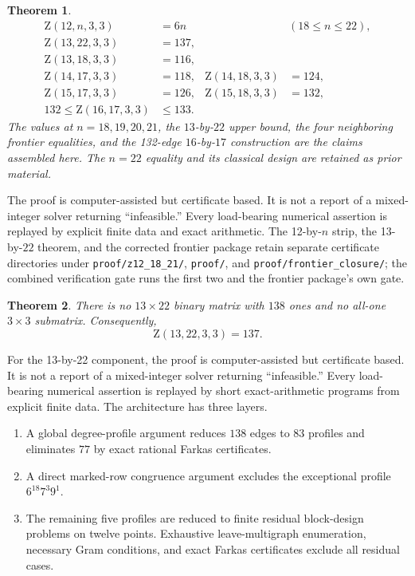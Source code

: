 \documentclass[10pt,a4paper]{amsart}
\newtheorem{theorem}{Theorem}[section]
\newcommand{\Z}{\mathrm Z}
\begin{document}
\begin{theorem}\label{thm:combined}
\begin{align*}
\Z(12,n,3,3)&=6n &&(18\le n\le22),\\
\Z(13,22,3,3)&=137,\\
\Z(13,18,3,3)&=116,\\
\Z(14,17,3,3)&=118, & \Z(14,18,3,3)&=124,\\
\Z(15,17,3,3)&=126, & \Z(15,18,3,3)&=132,\\
132\le\Z(16,17,3,3)&\le133.
\end{align*}
The values at $n=18,19,20,21$, the $13$-by-$22$ upper bound, the four
neighboring frontier equalities, and the 132-edge $16$-by-$17$ construction
are the claims assembled here. The $n=22$ equality and its classical design
are retained as prior material.
\end{theorem}

The proof is computer-assisted but certificate based. It is not a report of a mixed-integer solver returning ``infeasible.'' Every load-bearing numerical assertion is replayed by explicit finite data and exact arithmetic. The 12-by-$n$ strip, the 13-by-$22$ theorem, and the corrected frontier package retain separate certificate directories under \texttt{proof/z12\_18\_21/}, \texttt{proof/}, and \texttt{proof/frontier\_closure/}; the combined verification gate runs the first two and the frontier package's own gate.


\begin{theorem}\label{thm:13}
There is no $13\times22$ binary matrix with $138$ ones and no all-one $3\times3$ submatrix. Consequently,
\[
  \boxed{\Z(13,22,3,3)=137}.
\]
\end{theorem}


For the 13-by-22 component, the proof is computer-assisted but certificate based. It is not a report of a mixed-integer solver returning ``infeasible.'' Every load-bearing numerical assertion is replayed by short exact-arithmetic programs from explicit finite data. The architecture has three layers.

\begin{enumerate}[label=(\roman*)]
\item A global degree-profile argument reduces $138$ edges to $83$ profiles and eliminates $77$ by exact rational Farkas certificates.
\item A direct marked-row congruence argument excludes the exceptional profile $6^{18}7^3 9^1$.
\item The remaining five profiles are reduced to finite residual block-design problems on twelve points. Exhaustive leave-multigraph enumeration, necessary Gram conditions, and exact Farkas certificates exclude all residual cases.
\end{enumerate}
\end{document}
